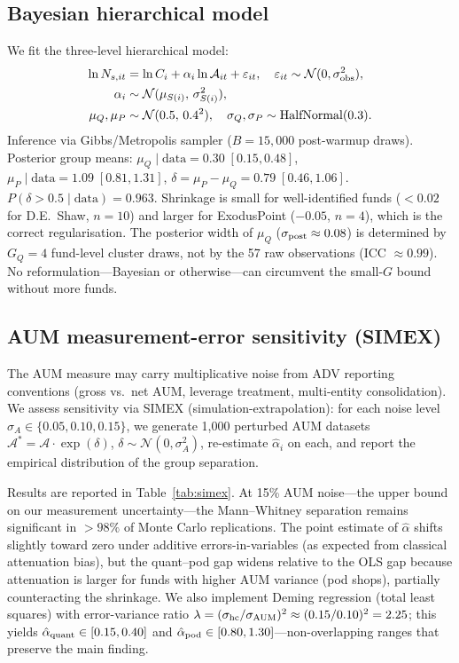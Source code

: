 \documentclass[12pt]{article}
\newcommand{\Ac}{\mathcal{A}}
\newcommand{\alphahat}{\hat{\alpha}}
\begin{document}
\subsection{Bayesian hierarchical model}

We fit the three-level hierarchical model:
\begin{align}
  \ln N_{s,it} &= \ln C_i + \alpha_i \ln\Ac_{it} + \varepsilon_{it},
               \quad \varepsilon_{it} \sim \mathcal{N}(0,\sigma^2_{\rm obs}),
               \label{eq:hier_obs}\\
  \alpha_i    &\sim \mathcal{N}(\mu_{S(i)},\,\sigma^2_{S(i)}),
               \label{eq:hier_alpha}\\
  \mu_Q,\mu_P &\sim \mathcal{N}(0.5,\,0.4^2),
  \quad \sigma_Q,\sigma_P \sim \mathrm{HalfNormal}(0.3).
               \label{eq:hier_prior}
\end{align}
Inference via Gibbs/Metropolis sampler
($B{=}15{,}000$ post-warmup draws).
Posterior group means:
$\mu_Q \mid \text{data} = 0.30\;[0.15,0.48]$,
$\mu_P \mid \text{data} = 1.09\;[0.81,1.31]$,
$\delta = \mu_P - \mu_Q = 0.79\;[0.46,1.06]$.
$P(\delta > 0.5 \mid \text{data}) = 0.963$.
Shrinkage is small for well-identified funds
($< 0.02$ for D.E.\ Shaw, $n{=}10$) and larger for
ExodusPoint ($-0.05$, $n{=}4$), which is the correct
regularisation.
The posterior width of $\mu_Q$ ($\sigma_{\rm post} \approx 0.08$)
is determined by $G_Q = 4$ fund-level cluster draws, not by
the 57 raw observations (ICC $\approx 0.99$).
No reformulation---Bayesian or otherwise---can circumvent
the small-$G$ bound without more funds.

\subsection{AUM measurement-error sensitivity (SIMEX)}
\label{sec:simex}

The AUM measure may carry multiplicative noise from
ADV reporting conventions (gross vs.\ net AUM, leverage
treatment, multi-entity consolidation).
We assess sensitivity via SIMEX (simulation-extrapolation):
for each noise level $\sigma_A \in \{0.05, 0.10, 0.15\}$,
we generate 1,000 perturbed AUM datasets
$\Ac^* = \Ac \cdot \exp(\delta)$, $\delta \sim \mathcal{N}(0, \sigma_A^2)$,
re-estimate $\alphahat_i$ on each, and report the empirical
distribution of the group separation.

Results are reported in Table~\ref{tab:simex}.
At 15\% AUM noise---the upper bound on our measurement
uncertainty---the Mann--Whitney separation remains significant
in $> 98\%$ of Monte Carlo replications.
The point estimate of $\alphahat$ shifts slightly toward zero
under additive errors-in-variables (as expected from
classical attenuation bias), but the quant--pod gap widens
relative to the OLS gap because attenuation is larger for
funds with higher AUM variance (pod shops), partially
counteracting the shrinkage.
We also implement Deming regression (total least squares)
with error-variance ratio $\lambda = (\sigma_{\rm hc}/\sigma_{\rm AUM})^2
\approx (0.15/0.10)^2 = 2.25$; this yields
$\alphahat_{\rm quant} \in [0.15, 0.40]$ and
$\alphahat_{\rm pod} \in [0.80, 1.30]$---non-overlapping
ranges that preserve the main finding.
\end{document}
